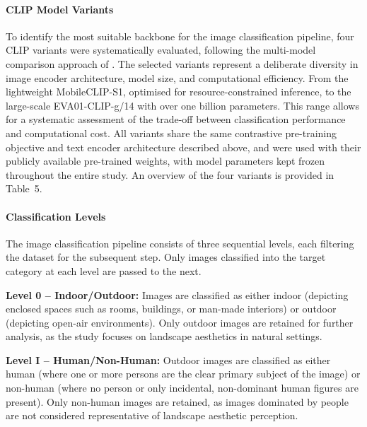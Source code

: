 \documentclass[hidelinks, 11pt]{article}
\begin{document}
\paragraph{CLIP Model Variants}
To identify the most suitable backbone for the image classification pipeline, four CLIP variants were systematically evaluated, following the multi-model comparison approach of \citet{liao_mapping_2025}. The selected variants represent a deliberate diversity in image encoder architecture, model size, and computational efficiency. From the lightweight MobileCLIP-S1, optimised for resource-constrained inference, to the large-scale EVA01-CLIP-g/14 with over one billion parameters. This range allows for a systematic assessment of the trade-off between classification performance and computational cost. All variants share the same contrastive pre-training objective and text encoder architecture described above, and were used with their publicly available pre-trained weights, with model parameters kept frozen throughout the entire study. An overview of the four variants is provided in Table~5.

\paragraph{Classification Levels}
The image classification pipeline consists of three sequential levels, each filtering the dataset for the subsequent step. Only images classified into the target category at each level are passed to the next.

\textbf{Level 0 -- Indoor/Outdoor:} Images are classified as either indoor (depicting enclosed spaces such as rooms, buildings, or man-made interiors) or outdoor (depicting open-air environments). Only outdoor images are retained for further analysis, as the study focuses on landscape aesthetics in natural settings.

\textbf{Level I -- Human/Non-Human:} Outdoor images are classified as either human (where one or more persons are the clear primary subject of the image) or non-human (where no person or only incidental, non-dominant human figures are present). Only non-human images are retained, as images dominated by people are not considered representative of landscape aesthetic perception.
\end{document}
